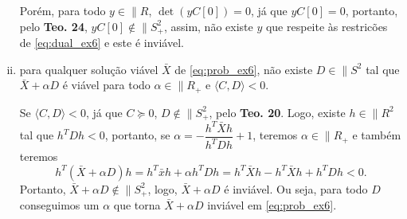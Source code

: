 \begin{homeworkProblem}
\begin{enumerate}[(i)]
\begin{homeworkProblemAnswer}
Porém, para todo $y \in \|{R}$, $\det(yC[0]) = 0$, já que $yC[0] = 0$, portanto, pelo \textbf{Teo. 24}, $yC[0] \notin \|{S}_+^2$, assim, não existe $y$ que respeite às restricões de \eqref{eq:dual_ex6} e este é inviável.
\end{homeworkProblemAnswer}

\item para qualquer solução viável $\bar{X}$ de \eqref{eq:prob_ex6}, não existe $D \in \|{S}^2$ tal que $\bar{X} + \alpha D$ é viável para todo $\alpha \in \|{R}_+$ e $\langle C, D \rangle < 0$.

\begin{homeworkProblemAnswer}
Se $\langle C, D \rangle < 0$, já que $C \succeq 0$, $D \notin \|{S}_+^2$, pelo \textbf{Teo. 20}. Logo, existe $h \in \|{R}^2$ tal que $h^TDh < 0$, portanto, se $\alpha = -\dfrac{h^T\bar{X}h}{h^TDh} + 1$, teremos $\alpha \in \|{R}_+$ e também teremos
$$ h^T(\bar{X} + \alpha D)h = h^T\bar{x}h + \alpha h^TDh = h^T\bar{X}h - h^T\bar{X}h + h^TDh < 0. $$
Portanto, $\bar{X} + \alpha D \notin \|{S}_+^2$, logo, $\bar{X} + \alpha D$ é inviável. Ou seja, para todo $D$ conseguimos um $\alpha$ que torna $\bar{X} + \alpha D$ inviável em \eqref{eq:prob_ex6}.
\end{homeworkProblemAnswer}

\end{enumerate}
\end{homeworkProblem}

